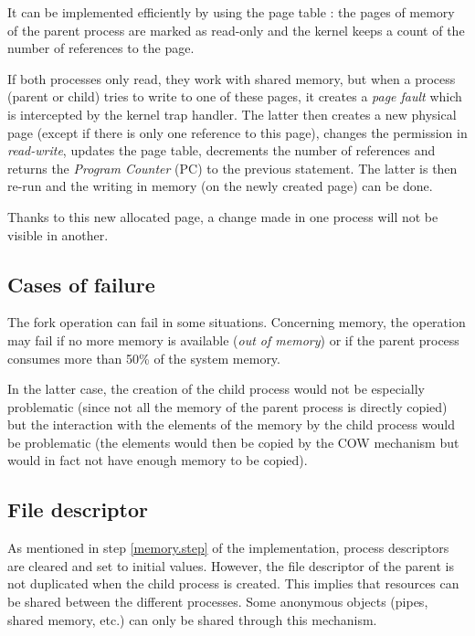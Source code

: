 \documentclass[a4paper, 12pt]{article}
\begin{document}
    It can be implemented efficiently by using the page table : the pages of memory of the parent process are marked as read-only and the kernel keeps a count of the number of references to the page.
    
    If both processes only read, they work with shared memory, but when a process (parent or child) tries to write to one of these pages, it creates a \emph{page fault} which is intercepted by the kernel trap handler. The latter then creates a new physical page (except if there is only one reference to this page), changes the permission in \emph{read-write}, updates the page table, decrements the number of references and returns the \emph{Program Counter} (PC) to the previous statement. The latter is then re-run and the writing in memory (on the newly created page) can be done.
    
    Thanks to this new allocated page, a change made in one process will not be visible in another.
    
    \subsection{Cases of failure}
    
    The fork operation can fail in some situations. Concerning memory, the operation may fail if no more memory is available (\emph{out of memory}) or if the parent process consumes more than 50\% of the system memory.
    
    In the latter case, the creation of the child process would not be especially problematic (since not all the memory of the parent process is directly copied) but the interaction with the elements of the memory by the child process would be problematic (the elements would then be copied by the COW mechanism but would in fact not have enough memory to be copied).
    
    \subsection{File descriptor}
    
    As mentioned in step \ref{memory.step} of the implementation, process descriptors are cleared and set to initial values. However, the file descriptor of the parent is not duplicated when the child process is created. This implies that resources can be shared between the different processes. Some anonymous objects (pipes, shared memory, etc.) can only be shared through this mechanism.
    
\end{document}
